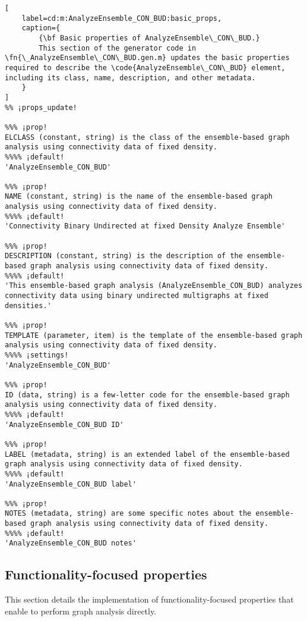 \documentclass{tufte-handout}
\begin{document}
\begin{lstlisting}[
	label=cd:m:AnalyzeEnsemble_CON_BUD:basic_props,
	caption={
		{\bf Basic properties of AnalyzeEnsemble\_CON\_BUD.}
		This section of the generator code in \fn{\_AnalyzeEnsemble\_CON\_BUD.gen.m} updates the basic properties required to describe the \code{AnalyzeEnsemble\_CON\_BUD} element, including its class, name, description, and other metadata.
	}
]
%% ¡props_update!

%%% ¡prop!
ELCLASS (constant, string) is the class of the ensemble-based graph analysis using connectivity data of fixed density.
%%%% ¡default!
'AnalyzeEnsemble_CON_BUD'

%%% ¡prop!
NAME (constant, string) is the name of the ensemble-based graph analysis using connectivity data of fixed density.
%%%% ¡default!
'Connectivity Binary Undirected at fixed Density Analyze Ensemble'

%%% ¡prop!
DESCRIPTION (constant, string) is the description of the ensemble-based graph analysis using connectivity data of fixed density.
%%%% ¡default!
'This ensemble-based graph analysis (AnalyzeEnsemble_CON_BUD) analyzes connectivity data using binary undirected multigraphs at fixed densities.'

%%% ¡prop!
TEMPLATE (parameter, item) is the template of the ensemble-based graph analysis using connectivity data of fixed density.
%%%% ¡settings!
'AnalyzeEnsemble_CON_BUD'

%%% ¡prop!
ID (data, string) is a few-letter code for the ensemble-based graph analysis using connectivity data of fixed density.
%%%% ¡default!
'AnalyzeEnsemble_CON_BUD ID'

%%% ¡prop!
LABEL (metadata, string) is an extended label of the ensemble-based graph analysis using connectivity data of fixed density.
%%%% ¡default!
'AnalyzeEnsemble_CON_BUD label'

%%% ¡prop!
NOTES (metadata, string) are some specific notes about the ensemble-based graph analysis using connectivity data of fixed density.
%%%% ¡default!
'AnalyzeEnsemble_CON_BUD notes'

\end{lstlisting}

\subsection{Functionality-focused properties}

This section details the implementation of functionality-focused properties that enable  to perform graph analysis directly.
\end{document}
